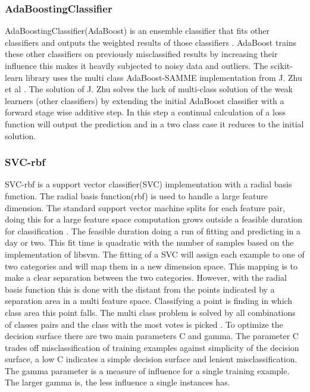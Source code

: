 \documentclass[a4paper,10pt]{article}
\begin{document}
\subsubsection{AdaBoostingClassifier}
AdaBoostingClassifier(AdaBoost) is an ensemble classifier that fits other classifiers and outputs the weighted results of those classifiers \cite{AdaBoost}. AdaBoost trains these other classifiers on previously misclassified results by increasing their influence this makes it heavily subjected to noisy data and outliers. The scikit-learn library uses the multi class AdaBoost-SAMME implementation from J. Zhu et al \cite{MadaB}. The solution of J. Zhu solves the lack of multi-class solution of the weak learners (other classifiers) by extending the initial AdaBoost classifier with a forward stage wise additive step. In this step a continual calculation of a loss function will output the prediction and in a two class case it reduces to the initial solution.

\subsubsection{SVC-rbf}
SVC-rbf is a support vector classifier(SVC) implementation with a radial basis function. The radial basis function(rbf) is used to handle a large feature dimension. The standard support vector machine splits for each feature pair, doing this for a large feature space computation grows outside a feasible duration for classification \cite{SVN}. The feasible duration doing a run of fitting and predicting in a day or two. This fit time is quadratic with the number of samples based on the implementation of libsvm\cite{SVM}. The fitting of a SVC will assign each example to one of two categories and will map them in a new dimension space. This mapping is to make a clear separation between the two categories. However, with the radial basis function this is done with the distant from the points indicated by a separation area in a multi feature space. Classifying a point is finding in which class area this point falls. The multi class problem is solved by  all combinations of classes pairs and the class with the most votes is picked \cite{Multi-pair-coup}. To optimize the decision surface there are two main parameters C and gamma. The parameter C trades off misclassification of training examples against simplicity of the decision surface, a low C indicates a simple decision surface and lenient misclassification. The gamma parameter is a measure of influence for a single training example. The larger gamma is, the less influence a single instances has.
\end{document}
